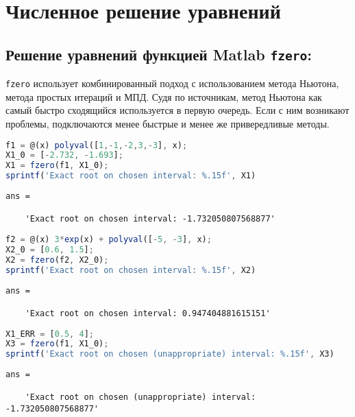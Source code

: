 \clearpage
\section{Численное решение уравнений}
\subsection{Решение уравнений функцией Matlab \texttt{fzero}:}
\texttt{fzero} использует комбинированный подход с использованием метода Ньютона, метода простых итераций и МПД. Судя по источникам, метод Ньютона как самый быстро сходящийся используется в первую очередь. Если с ним возникают проблемы, подключаются менее быстрые и менее же привередливые методы.

\begin{lstlisting}[language=Octave]
% Polynomial function
f1 = @(x) polyval([1,-1,-2,3,-3], x);
X1_0 = [-2.732, -1.693];
X1 = fzero(f1, X1_0);
sprintf('Exact root on chosen interval: %.15f', X1)
\end{lstlisting}
{\singlespacing
\begin{verbatim}
ans =

    'Exact root on chosen interval: -1.732050807568877'
\end{verbatim}}
\begin{lstlisting}[language=Octave, firstnumber=6]
% Transcendental function
f2 = @(x) 3*exp(x) + polyval([-5, -3], x);
X2_0 = [0.6, 1.5];
X2 = fzero(f2, X2_0);
sprintf('Exact root on chosen interval: %.15f', X2)
\end{lstlisting}
{\singlespacing
\begin{verbatim}
ans =

    'Exact root on chosen interval: 0.947404881615151'
\end{verbatim}}
\begin{lstlisting}[language=Octave, firstnumber=11]
% Root for interval, where Newton method conditions violate
X1_ERR = [0.5, 4];
X3 = fzero(f1, X1_0);
sprintf('Exact root on chosen (unappropriate) interval: %.15f', X3)
\end{lstlisting}
{\singlespacing
    \begin{verbatim}
ans =

    'Exact root on chosen (unappropriate) interval: -1.732050807568877'
\end{verbatim}}


